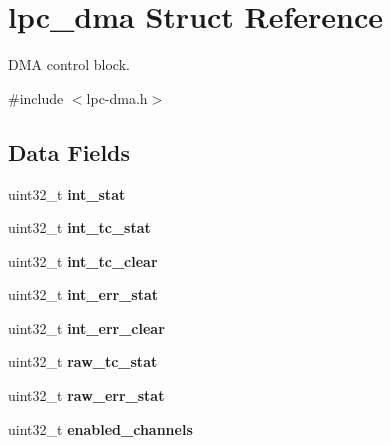 \hypertarget{structlpc__dma}{}\section{lpc\+\_\+dma Struct Reference}
\label{structlpc__dma}


D\+MA control block.  




{\ttfamily \#include $<$lpc-\/dma.\+h$>$}

\subsection*{Data Fields}
\begin{DoxyCompactItemize}
\item 
\mbox{\label{structlpc__dma_a57ac0fea7a66d56efe45a6212affd3ac}} 
uint32\+\_\+t {\bfseries int\+\_\+stat}
\item 
\mbox{\label{structlpc__dma_afd29cec457ad347b3b248da4185cdbdf}} 
uint32\+\_\+t {\bfseries int\+\_\+tc\+\_\+stat}
\item 
\mbox{\label{structlpc__dma_a1b0dde51e9471b581f5954db7d146ba7}} 
uint32\+\_\+t {\bfseries int\+\_\+tc\+\_\+clear}
\item 
\mbox{\label{structlpc__dma_a075a86713218a523240e56fe75697812}} 
uint32\+\_\+t {\bfseries int\+\_\+err\+\_\+stat}
\item 
\mbox{\label{structlpc__dma_a801751d82514d5f995361e27bcae5d4e}} 
uint32\+\_\+t {\bfseries int\+\_\+err\+\_\+clear}
\item 
\mbox{\label{structlpc__dma_a27f6e23e24222a05c14b2ae52bba1c34}} 
uint32\+\_\+t {\bfseries raw\+\_\+tc\+\_\+stat}
\item 
\mbox{\label{structlpc__dma_af9abfccc7bae57697dea885741cd1858}} 
uint32\+\_\+t {\bfseries raw\+\_\+err\+\_\+stat}
\item 
\mbox{\label{structlpc__dma_aa8135702c6c328dbeee41ad6ce845864}} 
uint32\+\_\+t {\bfseries enabled\+\_\+channels}
\item 
\mbox{\label{structlpc__dma_afedcbcd3503de4a345d49ea56b3e9478}} 

\end{DoxyCompactItemize}
